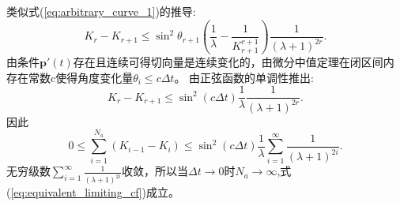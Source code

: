 类似式(\ref{eq:arbitrary_curve_1})的推导:
\begin{equation}
K_r-K_{r+1}\leq \sin^2\theta_{r+1}(\frac{1}{\lambda}-\frac{1}{K_{r+1}^{r+1}})\frac{1}{(\lambda+1)^{2r}}.
\end{equation}
由条件$\bm{p}'(t)$存在且连续可得切向量是连续变化的，由微分中值定理在闭区间内存在常数c使得角度变化量$\theta_i\leq c\Delta t$。
由正弦函数的单调性推出:
\begin{equation}
K_r-K_{r+1}\leq \sin^2 (c\Delta t) \frac{1}{\lambda}\frac{1}{(\lambda+1)^{2r}}.
\end{equation}
因此
\begin{equation}\label{eq:quatratic_convergence}
0\leq \sum_{i=1}^{N_a}(K_{i-1}-K_{i})\leq \sin^2 (c\Delta t) \frac{1}{\lambda}\sum_{i=1}^{\infty}\frac{1}{(\lambda+1)^{2i}}.
\end{equation}
无穷级数$\sum_{i=1}^{\infty}\frac{1}{(\lambda+1)^{2i}}$收敛，所以当$\Delta t\to 0$时$N_a\to \infty$,式(\ref{eq:equivalent_limiting_cf})成立。

